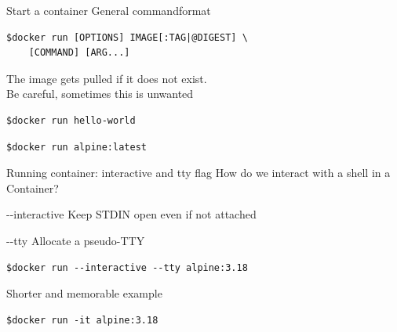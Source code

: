 \documentclass[12pt]{beamer}
\begin{document}
\begin{frame}[fragile]{Start a container}
    General commandformat
    \begin{lstlisting}[language=OwnBash]
$docker run [OPTIONS] IMAGE[:TAG|@DIGEST] \
    [COMMAND] [ARG...]
    \end{lstlisting}
    The image gets pulled if it does not exist.\\
    Be careful, sometimes this is unwanted
    \begin{lstlisting}[language=OwnBash]
$docker run hello-world
    \end{lstlisting}

    \begin{lstlisting}[language=OwnBash]
$docker run alpine:latest
    \end{lstlisting}
\end{frame}

\begin{frame}[fragile]{Running container: interactive and tty flag}
    \metroset{block=fill}
    How do we interact with a shell in a Container?
    \begin{block}{-{}-interactive \cite{docker_run}}
        Keep STDIN open even if not attached
    \end{block}
    \begin{block}{-{}-tty \cite{docker_run}}
        Allocate a pseudo-TTY
    \end{block}
    \begin{lstlisting}[language=OwnBash]
$docker run --interactive --tty alpine:3.18
    \end{lstlisting}
    Shorter and memorable example
    \begin{lstlisting}[language=OwnBash]
$docker run -it alpine:3.18
    \end{lstlisting}
\end{frame}
\end{document}
